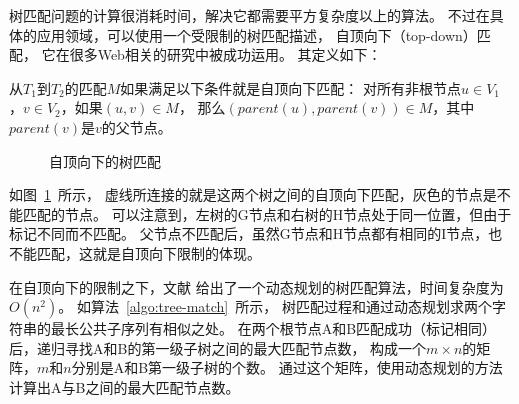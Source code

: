 树匹配问题的计算很消耗时间，解决它都需要平方复杂度以上的算法。
不过在具体的应用领域，可以使用一个受限制的树匹配描述，
自顶向下（top-down）匹配，
它在很多Web相关的研究中被成功运用。
其定义如下：

\begin{definition}
\label{def:top-down-mapping}
从$T_1$到$T_2$的匹配$M$如果满足以下条件就是自顶向下匹配：
对所有非根节点$u \in V_1$，$v \in V_2$，如果$(u,v) \in M$，
那么$(parent(u), parent(v)) \in M$，其中$parent(v)$是$v$的父节点。
\end{definition}

\begin{figure}[htbp]
\centering
{}
\caption{自顶向下的树匹配}
\label{fig:top-down-mapping}
\end{figure}

如图~\ref{fig:top-down-mapping}~所示，
虚线所连接的就是这两个树之间的自顶向下匹配，灰色的节点是不能匹配的节点。
可以注意到，左树的G节点和右树的H节点处于同一位置，但由于标记不同而不匹配。
父节点不匹配后，虽然G节点和H节点都有相同的I节点，也不能匹配，这就是自顶向下限制的体现。

在自顶向下的限制之下，文献\cite{yang1991identifying}
给出了一个动态规划的树匹配算法，时间复杂度为$O(n^2)$。
如算法~\ref{algo:tree-match}~所示，
树匹配过程和通过动态规划求两个字符串的最长公共子序列有相似之处。
在两个根节点A和B匹配成功（标记相同）后，递归寻找A和B的第一级子树之间的最大匹配节点数，
构成一个$m \times n$的矩阵，$m$和$n$分别是A和B第一级子树的个数。
通过这个矩阵，使用动态规划的方法计算出A与B之间的最大匹配节点数。

